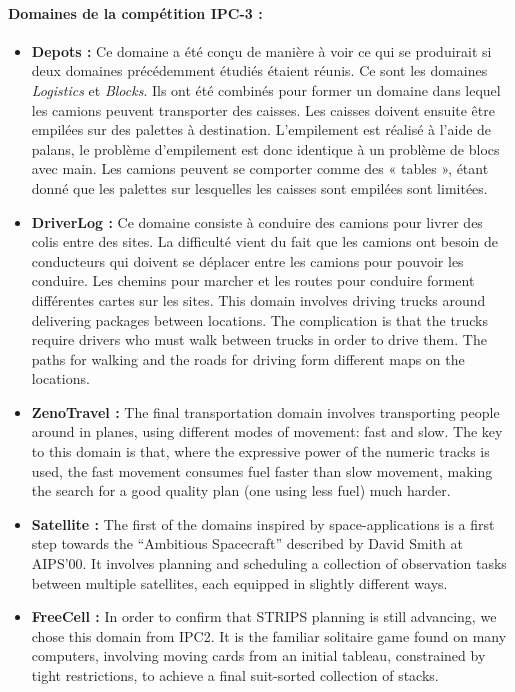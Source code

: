 \paragraph*{Domaines de la compétition IPC-3 :}
\begin{itemize}
\item \textbf{Depots :}
Ce domaine a été conçu de manière à voir ce qui se produirait si deux domaines précédemment étudiés étaient réunis. Ce sont les domaines \textit{Logistics} et \textit{Blocks}. Ils ont été combinés pour former un domaine dans lequel les camions peuvent transporter des caisses. Les caisses doivent ensuite être empilées sur des palettes à destination. L'empilement est réalisé à l'aide de palans, le problème d'empilement est donc identique à un problème de blocs avec main. Les camions peuvent se comporter comme des « tables », étant donné que les palettes sur lesquelles les caisses sont empilées sont limitées.
\item \textbf{DriverLog :}
Ce domaine consiste à conduire des camions pour livrer des colis entre des sites. La difficulté vient du fait que les camions ont besoin de conducteurs qui doivent se déplacer entre les camions pour pouvoir les conduire. Les chemins pour marcher et les routes pour conduire forment différentes cartes sur les sites.
{\color{red}This domain involves driving trucks around delivering packages between locations. The complication is that the trucks require drivers who must walk between trucks in order to drive them. The paths for walking and the roads for driving form different maps on the locations.}
\item \textbf{ZenoTravel :}
{\color{red}The final transportation domain involves transporting people around in planes, using different modes of movement: fast and slow. The key to this domain is that, where the expressive power of the numeric tracks is used, the fast movement consumes fuel faster than slow movement, making the search for a good quality plan (one using less fuel) much harder.}
\item \textbf{Satellite :}
{\color{red}The first of the domains inspired by space-applications is a first step towards the \enquote{Ambitious Spacecraft} described by David Smith at AIPS'00. It involves planning and scheduling a collection of observation tasks between multiple satellites, each equipped in slightly different ways.}
\item \textbf{FreeCell :}
{\color{red}In order to confirm that STRIPS planning is still advancing, we chose this domain from IPC2. It is the familiar solitaire game found on many computers, involving moving cards from an initial tableau, constrained by tight restrictions, to achieve a final suit-sorted collection of stacks.}
\end{itemize}

